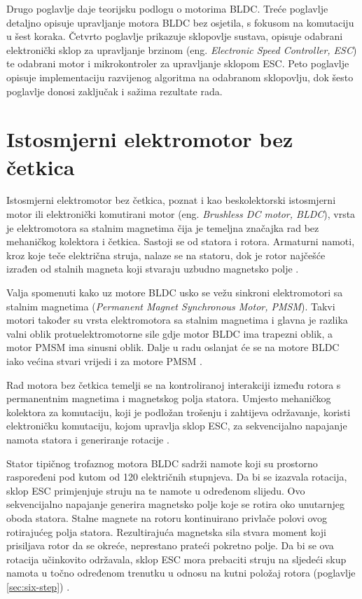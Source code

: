 \documentclass[diplomskirad]{fer}
\begin{document}
Drugo poglavlje daje teorijsku podlogu o motorima BLDC. Treće poglavlje
detaljno opisuje upravljanje motora BLDC bez osjetila, s fokusom na komutaciju
u šest koraka. Četvrto poglavlje prikazuje sklopovlje sustava, opisuje odabrani
elektronički sklop za upravljanje brzinom (eng. \textit{Electronic Speed
	Controller, ESC}) te odabrani motor i mikrokontroler za upravljanje sklopom
ESC. Peto poglavlje opisuje implementaciju razvijenog algoritma na odabranom
sklopovlju, dok šesto poglavlje donosi zaključak i sažima rezultate rada.
\chapter{Istosmjerni elektromotor bez četkica}
\label{pog:bldc}

Istosmjerni elektromotor bez četkica, poznat i kao beskolektorski istosmjerni
motor ili elektronički komutirani motor (eng. \textit{Brushless DC motor,
	BLDC}), vrsta je elektromotora sa stalnim magnetima čija je temeljna značajka
rad bez mehaničkog kolektora i četkica. Sastoji se od statora i rotora.
Armaturni namoti, kroz koje teče električna struja, nalaze se na statoru, dok
je rotor najčešće izrađen od stalnih magneta koji stvaraju uzbudno magnetsko
polje \cite{elektromotor-beskolektorski}. 

Valja spomenuti kako uz motore BLDC usko se vežu sinkroni elektromotori sa
stalnim magnetima (\textit{Permanent Magnet Synchronous Motor, PMSM}). Takvi
motori također su vrsta elektromotora sa stalnim magnetima i glavna je razlika
valni oblik protuelektromotorne sile gdje motor BLDC ima trapezni oblik, a
motor PMSM ima sinusni oblik. Dalje u radu oslanjat će se na motore BLDC iako
većina stvari vrijedi i za motore PMSM
\cite{elektromotor-sa-stalnim-magnetima}.

Rad motora bez četkica temelji se na kontroliranoj interakciji između rotora s
permanentnim magnetima i magnetskog polja statora. Umjesto mehaničkog kolektora
za komutaciju, koji je podložan trošenju i zahtijeva održavanje, koristi
elektroničku komutaciju, kojom upravlja sklop ESC, za sekvencijalno napajanje
namota statora i generiranje rotacije \cite{cite:disertacija}.

Stator tipičnog trofaznog motora BLDC sadrži namote koji su prostorno
raspoređeni pod kutom od 120 električnih stupnjeva. Da bi se izazvala rotacija,
sklop ESC primjenjuje struju na te namote u određenom slijedu. Ovo
sekvencijalno napajanje generira magnetsko polje koje se rotira oko unutarnjeg
oboda statora. Stalne magnete na rotoru kontinuirano privlače polovi ovog
rotirajućeg polja statora. Rezultirajuća magnetska sila stvara moment koji
prisiljava rotor da se okreće, neprestano prateći pokretno polje. Da bi se ova
rotacija učinkovito održavala, sklop ESC mora prebaciti struju na sljedeći skup
namota u točno određenom trenutku u odnosu na kutni položaj rotora (poglavlje
\ref{sec:six-step}) \cite{MicrochipAN885}.
\end{document}
